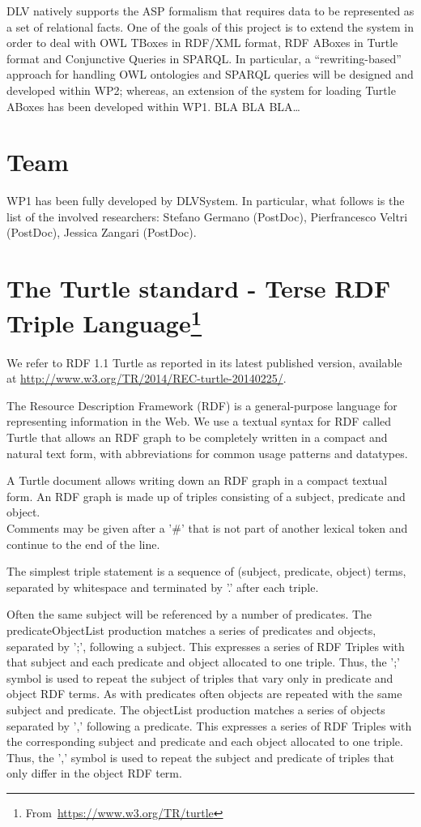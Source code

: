 \documentclass[oneside]{book}
\newcommand{\ste}[1]{\todo[color=green!40, bordercolor=green!80, author=Stefano]{#1}{}}
\begin{document}
DLV natively supports the ASP formalism that requires data to be represented as a set of relational facts. One of the goals of this project is to extend the system in order to deal with OWL TBoxes in RDF/XML format, RDF ABoxes in Turtle format and Conjunctive Queries in SPARQL. In particular, a ``rewriting-based'' approach for handling OWL ontologies and SPARQL queries will be designed and developed within WP2; whereas, an extension of the system for loading Turtle ABoxes has been developed within WP1. 
BLA BLA BLA…\ste{Fix introduction}

\section{Team}
WP1 has been fully developed by DLVSystem. In particular, what follows is the list of the involved researchers: Stefano Germano (PostDoc), Pierfrancesco Veltri (PostDoc), Jessica Zangari (PostDoc).



\section{The Turtle standard - Terse RDF Triple Language\texorpdfstring{\protect\footnote{From~\url{https://www.w3.org/TR/turtle}}}{}}

We refer to RDF 1.1 Turtle as reported in its latest published version, available at \url{http://www.w3.org/TR/2014/REC-turtle-20140225/}.

The Resource Description Framework (RDF) is a general-purpose language for representing information in the Web.
We use a textual syntax for RDF called Turtle that allows an RDF graph to be completely written in a compact and natural text form, with abbreviations for common usage patterns and datatypes.

A Turtle document allows writing down an RDF graph in a compact textual form. An RDF graph is made up of triples consisting of a subject, predicate and object.\\
Comments may be given after a '\#' that is not part of another lexical token and continue to the end of the line.

The simplest triple statement is a sequence of (subject, predicate, object) terms, separated by whitespace and terminated by '.' after each triple.

Often the same subject will be referenced by a number of predicates. The predicateObjectList production matches a series of predicates and objects, separated by ';', following a subject. This expresses a series of RDF Triples with that subject and each predicate and object allocated to one triple. Thus, the ';' symbol is used to repeat the subject of triples that vary only in predicate and object RDF terms.
As with predicates often objects are repeated with the same subject and predicate. The objectList production matches a series of objects separated by ',' following a predicate. This expresses a series of RDF Triples with the corresponding subject and predicate and each object allocated to one triple. Thus, the ',' symbol is used to repeat the subject and predicate of triples that only differ in the object RDF term.
\end{document}
